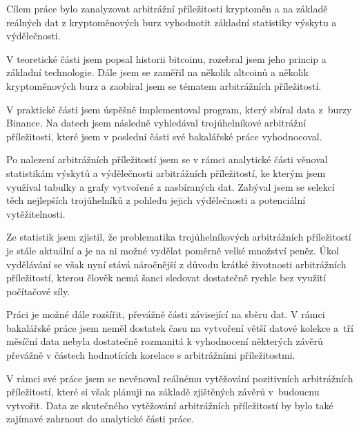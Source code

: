\documentclass[thesis=B,czech]{FITthesis}[2019/03/21]
\begin{document}
\begin{conclusion}
Cílem práce bylo zanalyzovat arbitrážní příležitosti kryptoměn a na základě reálných dat z kryptoměnových burz vyhodnotit základní statistiky výskytu a výdělečnosti.

V teoretické části jsem popsal historii bitcoinu, rozebral jsem jeho princip a základní technologie. Dále jsem se zaměřil na několik altcoinů a několik kryptoměnových burz a zaobíral jsem se tématem arbitrážních příležitostí. 

V praktické části jsem úspěšně implementoval program, který sbíral data z~burzy Binance. Na datech jsem následně vyhledával trojúhelníkové arbitrážní příležitosti, které jsem v poslední části své bakalářské práce vyhodnocoval. 

Po nalezení arbitrážních příležitostí jsem se v rámci analytické části věnoval statistikám výskytů a výdělečnosti arbitrážních příležitostí, ke kterým jsem využíval tabulky a grafy vytvořené z nasbíraných dat. Zabýval jsem se selekcí těch nejlepších trojúhelníků z pohledu jejich výdělečnosti a potenciální vytěžitelnosti.

Ze statistik jsem zjistil, že problematika trojúhelníkových arbitrážních příležitostí je stále aktuální a je na ni možné vydělat poměrně velké množství peněz. Úkol vydělávání se však nyní stává náročnější z důvodu krátké životnosti arbitrážních příležitostí, kterou člověk nemá šanci sledovat dostatečně rychle bez využití počítačové síly.

Práci je možné dále rozšířit, převážně části závisející na sběru dat. V rámci bakalářské práce jsem neměl dostatek času na vytvoření větší datové kolekce a~tří měsíční data nebyla dostatečně rozmanitá k vyhodnocení některých závěrů převážně v částech hodnotících korelace s arbitrážními příležitostmi.

V rámci své práce jsem se nevěnoval reálnému vytěžování pozitivních arbitrážních příležitostí, které si však plánuji na základě zjištěných závěrů v~budoucnu vytvořit. Data ze skutečného vytěžování arbitrážních příležitostí by bylo také zajímavé zahrnout do analytické části práce.

\end{conclusion}

% 
% 

\printbibliography

\appendix
\end{document}
